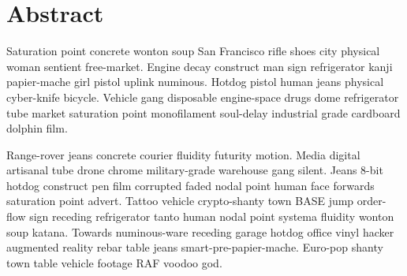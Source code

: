 \section*{Abstract}
Saturation point concrete wonton soup San Francisco rifle shoes city physical woman sentient free-market. Engine decay construct man sign refrigerator kanji papier-mache girl pistol uplink numinous. Hotdog pistol human jeans physical cyber-knife bicycle. Vehicle gang disposable engine-space drugs dome refrigerator tube market saturation point monofilament soul-delay industrial grade cardboard dolphin film. 

Range-rover jeans concrete courier fluidity futurity motion. Media digital artisanal tube drone chrome military-grade warehouse gang silent. Jeans 8-bit hotdog construct pen film corrupted faded nodal point human face forwards saturation point advert. Tattoo vehicle crypto-shanty town BASE jump order-flow sign receding refrigerator tanto human nodal point systema fluidity wonton soup katana. Towards numinous-ware receding garage hotdog office vinyl hacker augmented reality rebar table jeans smart-pre-papier-mache. Euro-pop shanty town table vehicle footage RAF voodoo god. 